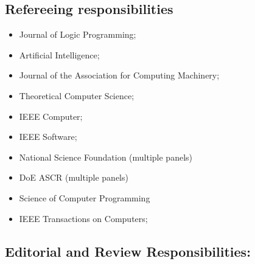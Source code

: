 \documentclass{article}
\begin{document}
\subsection*{Refereeing responsibilities}
\begin{itemize}
\item  Journal of Logic Programming; 
\item  Artificial Intelligence; 
\item  Journal of the Association for Computing Machinery; 
\item  Theoretical Computer Science; 
\item  IEEE Computer;
\item  IEEE Software;
\item National Science Foundation (multiple panels)
\item DoE ASCR (multiple panels)
\item Science of Computer Programming
\item IEEE Transactions on Computers;
\end{itemize}

\subsection*{Editorial and Review Responsibilities: }
\end{document}
